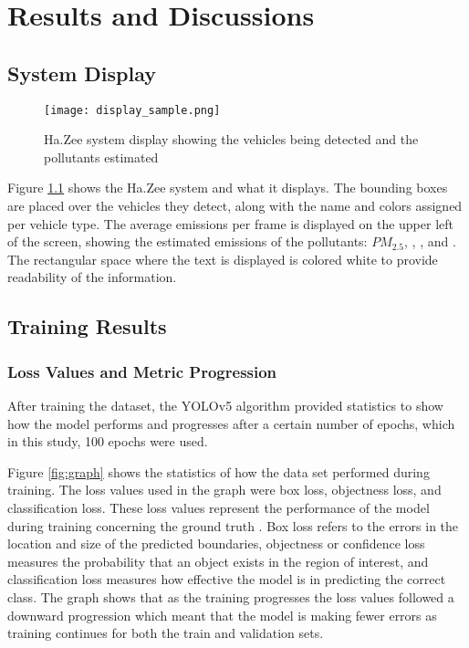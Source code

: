 \chapter{Results and Discussions}

\section{System Display}

\begin{figure}[!htbp]
	\texttt{[image: display\_sample.png]}
	\caption{Ha.Zee system display showing the vehicles being detected and the pollutants estimated}
	\label{fig:display}
\end{figure}
\FloatBarrier

Figure \ref{fig:display} shows the Ha.Zee system and what it displays. The bounding boxes are placed over the vehicles they detect, along with the name and colors assigned per vehicle type. The average emissions per frame is displayed on the upper left of the screen, showing the estimated emissions of the pollutants: $PM_{2.5}$, , , and . The rectangular space where the text is displayed is colored white to provide readability of the information.



\section{Training Results}

\subsection{Loss Values and Metric Progression}
After training the dataset, the YOLOv5 algorithm provided statistics to show how the model performs and progresses after a certain number of epochs, which in this study, 100 epochs were used.



Figure \ref{fig:graph} shows the statistics of how the data set performed during training. The loss values used in the graph were box loss, objectness loss, and classification loss. These loss values represent the performance of the model during training concerning the ground truth \cite{
Hui_2022}. Box loss refers to the errors in the location and size of the predicted boundaries, objectness or confidence loss measures the probability that an object exists in the region of interest, and classification loss measures how effective the model is in predicting the correct class. The graph shows that as the training progresses the loss values followed a downward progression which meant that the model is making fewer errors as training continues for both the train and validation sets.

